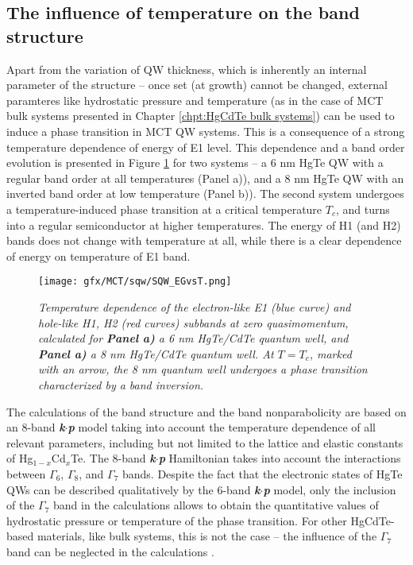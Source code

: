 \documentclass[titlepage,a4paper]{book}
\newcommand{\wciecie}{\quad\phantom{v}}
\begin{document}
\subsection{The influence of temperature on the band structure}
\wciecie
Apart from the variation of QW thickness, which is inherently an internal parameter of the structure -- once set (at growth) cannot be changed, external paramteres like hydrostatic pressure \cite{Krishtopenko_pressure} and temperature \cite{Wiedmann_State} (as in the case of MCT bulk systems presented in Chapter \ref{chpt:HgCdTe bulk systems}) can be used to induce a phase transition in MCT QW systems. This is a consequence of a strong temperature dependence of energy of E1 level. This dependence and a band order evolution is presented in Figure \ref{fig:SQW_EGvsT} for two systems -- a 6 nm HgTe QW with a regular band order at all temperatures (Panel a)), and a 8 nm HgTe QW with an inverted band order at low temperature (Panel b)). The second system undergoes a temperature-induced phase transition at a critical temperature $T_c$, and turns into a regular semiconductor at higher temperatures. The energy of H1 (and H2) bands does not change with temperature at all, while there is a clear dependence of energy on temperature of E1 band.

\begin{figure}[ht]
	\centering
	\texttt{[image: gfx/MCT/sqw/SQW\_EGvsT.png]}
	\vspace{-10pt}
	\caption{\textit{Temperature dependence of the electron-like E1 (blue curve) and hole-like H1, H2 (red curves) subbands at zero quasimomentum, calculated for \textbf{Panel a)} a 6 nm HgTe/CdTe quantum well, and \textbf{Panel a)} a 8 nm HgTe/CdTe quantum well. At $T = T_c$, marked with an arrow, the 8 nm quantum well undergoes a phase transition characterized by a band inversion.}}
	\label{fig:SQW_EGvsT}
\end{figure} 

The calculations of the band structure and the band nonparabolicity are based on an 8-band \textbf{\textit{k$\cdot$p}} model taking into account the temperature dependence of all relevant parameters, including but not limited to the lattice and elastic constants of Hg$_{1-x}$Cd$_x$Te. The 8-band \textbf{\textit{k$\cdot$p}} Hamiltonian takes into account the interactions between $\Gamma_6$, $\Gamma_8$, and $\Gamma_7$ bands. Despite the fact that the electronic states of HgTe QWs can be described qualitatively by the 6-band \textbf{\textit{k$\cdot$p}} model, only the inclusion of the $\Gamma_7$ band in the calculations allows to obtain the quantitative values of hydrostatic pressure or temperature of the phase transition. For other HgCdTe-based materials, like bulk systems, this is not the case -- the influence of the $\Gamma_7$ band can be neglected in the calculations \cite{Malcolm_MCT}.
\end{document}
